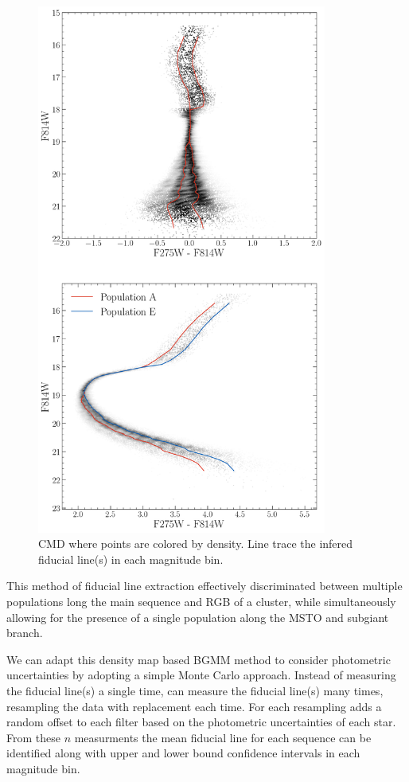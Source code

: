 \begin{figure}
	\centering
	\includegraphics[width=0.85\textwidth]{figures/ngc2808/vertFit.png}
	\caption{CMD where points are colored by density. Line trace the infered 
	fiducial line(s) in each magnitude bin.}
	\label{fig:vertFit}
\end{figure}

This method of fiducial line extraction effectively discriminated between
multiple populations long the main sequence and RGB of a cluster, while
simultaneously allowing for the presence of a single population along the MSTO
and subgiant branch. 

We can adapt this density map based BGMM method to consider photometric
uncertainties by adopting a simple Monte Carlo approach. Instead of measuring
the fiducial line(s) a single time, \fidanka can measure the fiducial line(s)
many times, resampling the data with replacement each time. For each resampling
\fidanka adds a random offset to each filter based on the photometric
uncertainties of each star. From these $n$ measurments the mean fiducial line
for each sequence can be identified along with upper and lower bound confidence
intervals in each magnitude bin.

